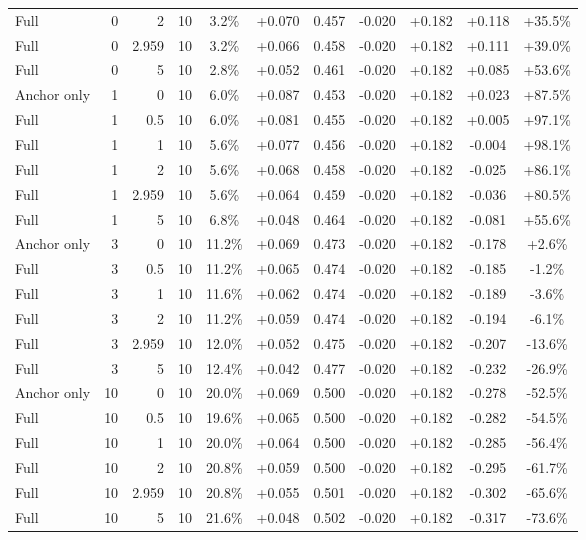\begin{table}[htbp]
\begin{tabular}{lrrrccccccc}
Full & 0 & 2 & 10 & 3.2\% & +0.070 & 0.457 & -0.020 & +0.182 & +0.118 & +35.5\% \\
Full & 0 & 2.959 & 10 & 3.2\% & +0.066 & 0.458 & -0.020 & +0.182 & +0.111 & +39.0\% \\
Full & 0 & 5 & 10 & 2.8\% & +0.052 & 0.461 & -0.020 & +0.182 & +0.085 & +53.6\% \\
Anchor only & 1 & 0 & 10 & 6.0\% & +0.087 & 0.453 & -0.020 & +0.182 & +0.023 & +87.5\% \\
Full & 1 & 0.5 & 10 & 6.0\% & +0.081 & 0.455 & -0.020 & +0.182 & +0.005 & +97.1\% \\
Full & 1 & 1 & 10 & 5.6\% & +0.077 & 0.456 & -0.020 & +0.182 & -0.004 & +98.1\% \\
Full & 1 & 2 & 10 & 5.6\% & +0.068 & 0.458 & -0.020 & +0.182 & -0.025 & +86.1\% \\
Full & 1 & 2.959 & 10 & 5.6\% & +0.064 & 0.459 & -0.020 & +0.182 & -0.036 & +80.5\% \\
Full & 1 & 5 & 10 & 6.8\% & +0.048 & 0.464 & -0.020 & +0.182 & -0.081 & +55.6\% \\
Anchor only & 3 & 0 & 10 & 11.2\% & +0.069 & 0.473 & -0.020 & +0.182 & -0.178 & +2.6\% \\
Full & 3 & 0.5 & 10 & 11.2\% & +0.065 & 0.474 & -0.020 & +0.182 & -0.185 & -1.2\% \\
Full & 3 & 1 & 10 & 11.6\% & +0.062 & 0.474 & -0.020 & +0.182 & -0.189 & -3.6\% \\
Full & 3 & 2 & 10 & 11.2\% & +0.059 & 0.474 & -0.020 & +0.182 & -0.194 & -6.1\% \\
Full & 3 & 2.959 & 10 & 12.0\% & +0.052 & 0.475 & -0.020 & +0.182 & -0.207 & -13.6\% \\
Full & 3 & 5 & 10 & 12.4\% & +0.042 & 0.477 & -0.020 & +0.182 & -0.232 & -26.9\% \\
Anchor only & 10 & 0 & 10 & 20.0\% & +0.069 & 0.500 & -0.020 & +0.182 & -0.278 & -52.5\% \\
Full & 10 & 0.5 & 10 & 19.6\% & +0.065 & 0.500 & -0.020 & +0.182 & -0.282 & -54.5\% \\
Full & 10 & 1 & 10 & 20.0\% & +0.064 & 0.500 & -0.020 & +0.182 & -0.285 & -56.4\% \\
Full & 10 & 2 & 10 & 20.8\% & +0.059 & 0.500 & -0.020 & +0.182 & -0.295 & -61.7\% \\
Full & 10 & 2.959 & 10 & 20.8\% & +0.055 & 0.501 & -0.020 & +0.182 & -0.302 & -65.6\% \\
Full & 10 & 5 & 10 & 21.6\% & +0.048 & 0.502 & -0.020 & +0.182 & -0.317 & -73.6\% \\

\end{tabular}
\end{table}
